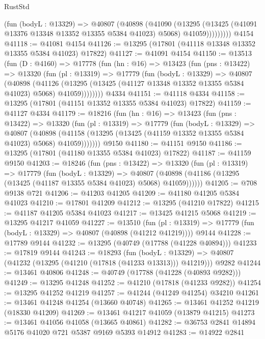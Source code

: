 \begin{lexlean}{RustStd}
\begin{coremodule}
              (fun (bodyL : @13329) =>
              @40807
                (@40898
                  (@41090
                    (@13295
                      (@13425 (@41091 @13376 @13348 @13352 @13355 @5384 @41023) @5068)
                      @41059)))))))))
    @4154
@41118 := @41081 @4154
@41126 := @13295 (@17801 (@41118 @13348 @13352 @13355 @5384 @41023) @17822)
@41127 := @41091 @4154
@41150 := @13513
    (fun (D : @4160) =>
    @17778
      (fun (hn : @16) =>
      @13423
        (fun (pns : @13422) =>
        @13320
          (fun (pl : @13319) =>
          @17779
            (fun (bodyL : @13329) =>
            @40807
              (@40898
                (@41126
                  (@13295 (@13425 (@41127 @13348 @13352 @13355 @5384 @41023) @5068) @41059))))))))
    @4334
@41151 := @41118 @4334
@41158 := @13295 (@17801 (@41151 @13352 @13355 @5384 @41023) @17822)
@41159 := @41127 @4334
@41179 := @18216
    (fun (hn : @16) =>
    @13423
      (fun (pns : @13422) =>
      @13320
        (fun (pl : @13319) =>
        @17779
          (fun (bodyL : @13329) =>
          @40807
            (@40898 (@41158 (@13295 (@13425 (@41159 @13352 @13355 @5384 @41023) @5068) @41059)))))))
    @9150
@41180 := @41151 @9150
@41186 := @13295 (@17801 (@41180 @13355 @5384 @41023) @17822)
@41187 := @41159 @9150
@41203 := @18246
    (fun (pns : @13422) =>
    @13320
      (fun (pl : @13319) =>
      @17779
        (fun (bodyL : @13329) =>
        @40807 (@40898 (@41186 (@13295 (@13425 (@41187 @13355 @5384 @41023) @5068) @41059))))))
@41205 := @708 @9138 @721
@41206 := @41203 @41205
@41209 := @41180 @41205 @5384 @41023
@41210 := @17801 @41209
@41212 := @13295 (@41210 @17822)
@41215 := @41187 @41205 @5384 @41023
@41217 := @13425 @41215 @5068
@41219 := @13295 @41217 @41059
@41227 := @13510
    (fun (pl : @13319) => @17779 (fun (bodyL : @13329) => @40807 (@40898 (@41212 @41219))))
    @9144
@41228 := @17789 @9144
@41232 := @13295 (@40749 (@17788 (@41228 @40894)))
@41233 := @17819 @9144
@41243 := @18293
    (fun (bodyL : @13329) => @40807 (@41232 (@13295 (@41210 (@17818 (@41233 @13313))) @41219)))
    @9282
@41244 := @13461 @40806
@41248 := @40749 (@17788 (@41228 (@40893 @9282)))
@41249 := @13295 @41248
@41252 := @41210 (@17818 (@41233 @9282))
@41254 := @13295 @41252 @41219
@41257 := @41244 (@41249 @41254) @34210
@41261 := @13461 @41248 @41254 (@13660 @40748)
@41265 := @13461 @41252 @41219 (@18330 @41209)
@41269 := @13461 @41217 @41059 (@13879 @41215)
@41273 := @13461 @41056 @41058 (@13665 @40861)
@41282 := @36753 @2841 @14894 @5176 @41020 @721 @5387 @9169 @5393 @14912
@41283 := @14922 @2841

\end{coremodule}
\end{lexlean}
